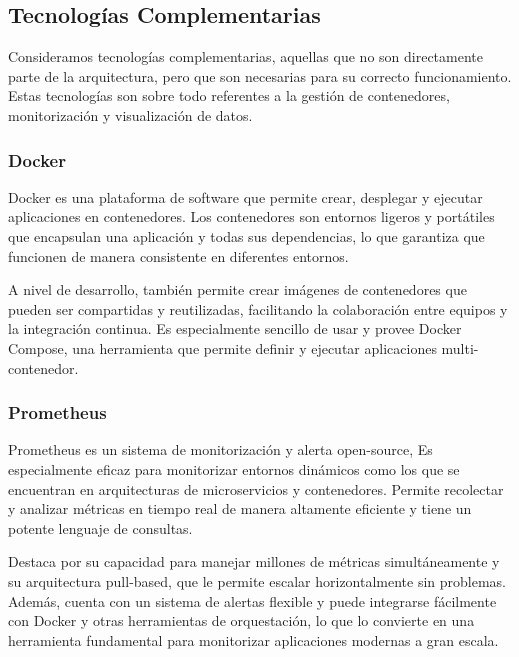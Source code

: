 \subsection{Tecnologías Complementarias}

Consideramos tecnologías complementarias, aquellas que no son directamente parte de la arquitectura, pero que son necesarias para su correcto funcionamiento.\newline
Estas tecnologías son sobre todo referentes a la gestión de contenedores, monitorización y visualización de datos.

\subsubsection{Docker}

Docker es una plataforma de software que permite crear, desplegar y ejecutar aplicaciones en contenedores. 
Los contenedores son entornos ligeros y portátiles que encapsulan una aplicación y todas sus dependencias, lo que garantiza que funcionen de manera consistente en diferentes entornos.\newline

A nivel de desarrollo, también permite crear imágenes de contenedores que pueden ser compartidas y reutilizadas, facilitando la colaboración entre equipos y la integración continua.
Es especialmente sencillo de usar y provee Docker Compose, una herramienta que permite definir y ejecutar aplicaciones multi-contenedor.

\subsubsection{Prometheus}
Prometheus es un sistema de monitorización y alerta open-source, Es especialmente eficaz para monitorizar entornos dinámicos como los que se encuentran en arquitecturas de microservicios y contenedores.
Permite recolectar y analizar métricas en tiempo real de manera altamente eficiente y tiene un potente lenguaje de consultas. \newline

Destaca por su capacidad para manejar millones de métricas simultáneamente y su arquitectura pull-based, que le permite escalar horizontalmente sin problemas. 
Además, cuenta con un sistema de alertas flexible y puede integrarse fácilmente con Docker y otras herramientas de orquestación, 
lo que lo convierte en una herramienta fundamental para monitorizar aplicaciones modernas a gran escala.

